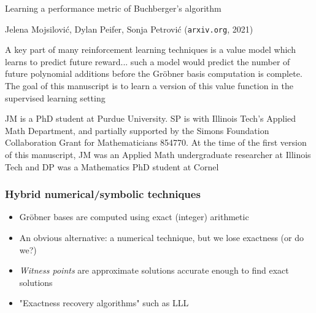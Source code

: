 \documentclass{beamer}
\begin{document}
\begin{frame}

\begin{exampleblock}{Learning a performance metric of Buchberger's algorithm

Jelena Mojsilovi\'c, Dylan Peifer, Sonja Petrovi\'c ({\tt arxiv.org}, 2021)
}
A key part of many reinforcement learning techniques
is a value model which learns to predict future reward...
such a model would predict the number of future polynomial
additions before the Gr\"obner basis computation is complete. The goal of this manuscript is
to learn a version of this value function in the supervised learning setting
\end{exampleblock}

\begin{exampleblock}{}
JM is a PhD student at Purdue University. SP is with Illinois Tech's Applied Math Department, and
partially supported by the Simons Foundation Collaboration Grant for Mathematicians 854770. At the time
of the first version of this manuscript, JM was an Applied Math undergraduate researcher at Illinois Tech and
DP was a Mathematics PhD student at Cornel
\end{exampleblock}

\end{frame}

\begin{frame}
\frametitle{Hybrid numerical/symbolic techniques}
\begin{itemize}
\item Gr\"obner bases are computed using exact (integer) arithmetic
\item An obvious alternative: a numerical technique, but we lose exactness (or do we?)
\item {\it Witness points} are approximate solutions accurate enough to find exact solutions
\item "Exactness recovery algorithms" such as LLL
\end{itemize}

\end{frame}
\end{document}
